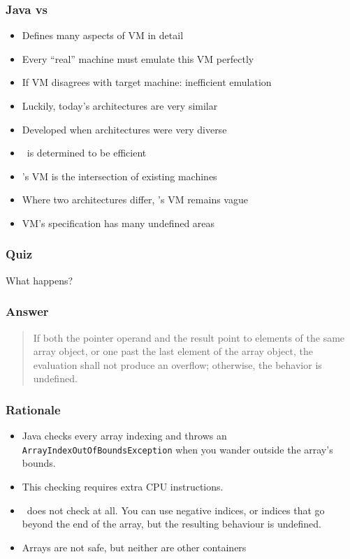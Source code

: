 \begin{frame}
  \frametitle{Java vs \cpp}
  \begin{itemize}
    \item Defines many aspects of VM in detail
    \item Every ``real'' machine must emulate this VM perfectly
    \item If VM disagrees with target machine: inefficient emulation
    \item Luckily, today's architectures are very similar
  \end{itemize}
  \vskip5mm
  \structure{\cpp}
  \begin{itemize}
    \item Developed when architectures were very diverse
    \item \cpp\ is determined to be efficient
    \item \cpp's VM is the intersection of existing machines
    \item Where two architectures differ, \cpp's VM remains vague
    \item VM's specification has many undefined areas
  \end{itemize}
\end{frame}

\begin{frame}
  \frametitle{Quiz}
  \begin{center}
    {\Large What happens?}\vskip1cm
  \end{center}
\end{frame}

\begin{frame}
  \frametitle{Answer}
  \begin{quote}
    If both the pointer operand and the result point to elements of the same array object, or one past
    the last element of the array object, the evaluation shall not produce an overflow; otherwise, the behavior is
    undefined.\\
    \hfill {}
  \end{quote}
\end{frame}

\begin{frame}
  \frametitle{Rationale}
  \begin{itemize}
    \item Java checks every array indexing and throws an {\tt ArrayIndexOutOfBoundsException}
          when you wander outside the array's bounds.
    \item This checking requires extra CPU instructions.
    \item \cpp\ does not check at all. You can use negative indices, or indices that
          go beyond the end of the array, but the resulting behaviour is undefined.
    \item Arrays are not safe, but neither are other containers
  \end{itemize}
\end{frame}

